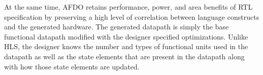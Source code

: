 At the same time, AFDO retains performance, power, and area benefits of RTL specification by preserving a high level of correlation between language constructs and the generated hardware. The generated datapath is simply the base functional datapath modified with the designer specified optimizations. Unlike HLS, the designer knows the number and types of functional units used in the datapath as well as the state elements that are present in the datapath along with how those state elements are updated.
